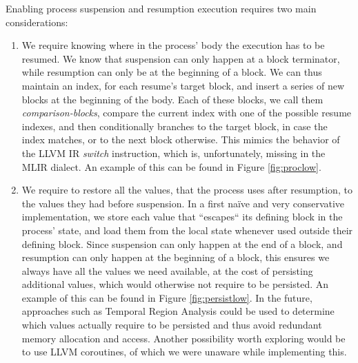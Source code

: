 Enabling process suspension and resumption execution requires two main considerations:
\begin{enumerate}
    \item We require knowing where in the process' body the execution has to be resumed. We know that suspension can only happen at a block terminator, while resumption can only be at the beginning of a block. We can thus maintain an index, for each resume's target block, and insert a series of new blocks at the beginning of the body. Each of these blocks, we call them \textit{comparison-blocks}, compare the current index with one of the possible resume indexes, and then conditionally branches to the target block, in case the index matches, or to the next block otherwise. This mimics the behavior of the LLVM IR \textit{switch} instruction, which is, unfortunately, missing in the MLIR dialect. An example of this can be found in Figure \ref{fig:proclow}.
    \item We require to restore all the values, that the process uses after resumption, to the values they had before suspension. In a first naïve and very conservative implementation, we store each value that “escapes“ its defining block in the process' state, and load them from the local state whenever used outside their defining block. Since suspension can only happen at the end of a block, and resumption can only happen at the beginning of a block, this ensures we always have all the values we need available, at the cost of persisting additional values, which would otherwise not require to be persisted.  An example of this can be found in Figure \ref{fig:persistlow}. In the future, approaches such as Temporal Region Analysis could be used to determine which values actually require to be persisted and thus avoid redundant memory allocation and access. Another possibility worth exploring would be to use LLVM coroutines, of which we were unaware while implementing this.
\end{enumerate}

